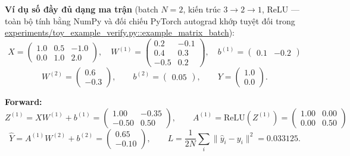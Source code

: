 \documentclass[12pt,a4paper]{article}
\begin{document}
\textbf{Ví dụ số đầy đủ dạng ma trận} (batch $N=2$, kiến trúc
$3\to2\to1$, ReLU --- toàn bộ tính bằng NumPy và đối chiếu PyTorch
autograd khớp tuyệt đối trong
\url{experiments/toy_example_verify.py::example_matrix_batch}):
$$X=\begin{pmatrix}1.0 & 0.5 & -1.0\\ 0.0 & 1.0 & 2.0\end{pmatrix},\quad
W^{(1)}=\begin{pmatrix}0.2 & -0.1\\ 0.4 & 0.3\\ -0.5 & 0.2\end{pmatrix},\quad
b^{(1)}=\begin{pmatrix}0.1 & -0.2\end{pmatrix}$$
$$W^{(2)}=\begin{pmatrix}0.6\\ -0.3\end{pmatrix},\qquad
b^{(2)}=\begin{pmatrix}0.05\end{pmatrix},\qquad
Y=\begin{pmatrix}1.0\\ 0.0\end{pmatrix}.$$

\textbf{Forward:}
$$Z^{(1)}=XW^{(1)}+b^{(1)} = \begin{pmatrix}1.00 & -0.35\\ -0.50 & 0.50\end{pmatrix},\qquad
A^{(1)}=\mathrm{ReLU}(Z^{(1)}) = \begin{pmatrix}1.00 & 0.00\\ 0.00 & 0.50\end{pmatrix}$$
$$\hat Y = A^{(1)}W^{(2)}+b^{(2)} = \begin{pmatrix}0.65\\ -0.10\end{pmatrix},\qquad
L=\frac{1}{2N}\sum_i\lVert \hat y_i-y_i\rVert^2 = 0.033125.$$
\end{document}
